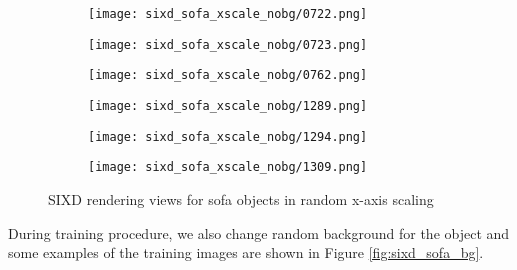 \begin{figure}[h!]
\begin{subfigure}[b]{0.32\linewidth}
    \texttt{[image: sixd\_sofa\_xscale\_nobg/0722.png]}
  \end{subfigure}
  \begin{subfigure}[b]{0.32\linewidth}
    \texttt{[image: sixd\_sofa\_xscale\_nobg/0723.png]}
  \end{subfigure}
  \begin{subfigure}[b]{0.32\linewidth}
    \texttt{[image: sixd\_sofa\_xscale\_nobg/0762.png]}
  \end{subfigure}
  \begin{subfigure}[b]{0.32\linewidth}
    \texttt{[image: sixd\_sofa\_xscale\_nobg/1289.png]}
  \end{subfigure}
  \begin{subfigure}[b]{0.32\linewidth}
    \texttt{[image: sixd\_sofa\_xscale\_nobg/1294.png]}
  \end{subfigure}
  \begin{subfigure}[b]{0.32\linewidth}
    \texttt{[image: sixd\_sofa\_xscale\_nobg/1309.png]}
  \end{subfigure}
  \caption{SIXD rendering views for sofa objects in random x-axis scaling}
  \label{fig:sixd_sofa_xscale_nobg}
\end{figure}

During training procedure, we also change random background for the object and some examples of the training images are shown in Figure \ref{fig:sixd_sofa_bg}.


